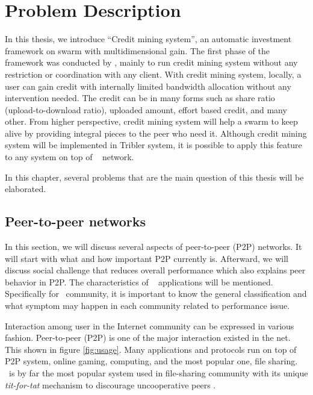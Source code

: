 \chapter{Problem Description}
\label{chp:relwork}
In this thesis, we introduce ``Credit mining system'', an automatic investment framework on swarm with multidimensional gain. The first phase of the framework was conducted by \citeauthor{2015:creditmining:capota}, mainly to run credit mining system without any restriction or coordination with any client. With credit mining system, locally, a user can gain credit with internally limited bandwidth allocation without any intervention needed. The credit can be in many forms such as share ratio (upload-to-download ratio), uploaded amount, effort based credit, and many other. From higher perspective, credit mining system will help a swarm to keep alive by providing integral pieces to the peer who need it. Although credit mining system will be implemented in Tribler system, it is possible to apply this feature to any system on top of \bt~ network.

In this chapter, several problems that are the main question of this thesis will be elaborated.
\section{Peer-to-peer networks}
In this section, we will discuss several aspects of peer-to-peer (P2P) networks. It will start with what and how important P2P currently is. Afterward, we will discuss social challenge that reduces overall performance which also explains peer behavior in P2P. The characteristics of \bt~ applications will be mentioned. Specifically for \bt~community, it is important to know the general classification and what symptom may happen in each community related to performance issue. 

Interaction among user in the Internet community can be expressed in various fashion. Peer-to-peer (P2P) is one of the major interaction existed in the net. This shown in figure \ref{fig:usage}. Many applications and protocols run on top of P2P system, online gaming, computing, and the most popular one, file sharing. \bt~is by far the most popular system used in file-sharing community with its unique \textit{tit-for-tat} mechanism to discourage uncooperative peers \cite{2003:bittorrent:cohen}. 

